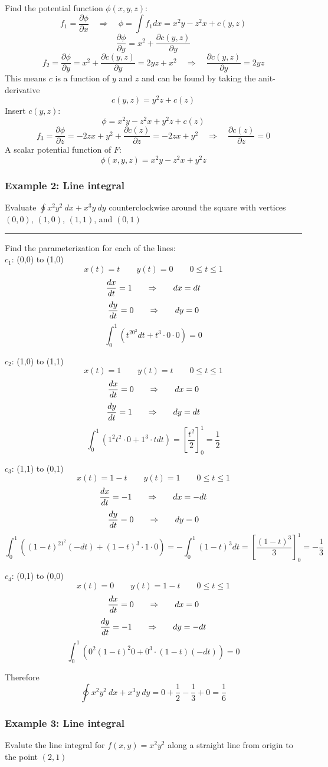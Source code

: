 Find the potential function $\phi(x,y,z)$:
$$f_1=\frac{\partial \phi}{\partial x}\quad\Rightarrow\quad \phi=\int f_1dx=x^2y-z^2x+c(y,z)$$
$$\frac{\partial \phi}{\partial y}=x^2+\frac{\partial c(y,z)}{\partial y}$$
$$f_2=\frac{\partial \phi}{\partial y}=x^2+\frac{\partial c(y,z)}{\partial y}=2yz+x^2\quad\Rightarrow\quad\frac{\partial c(y,z)}{\partial y}=2yz$$ This means $c$ is a function of $y$ and $z$ and can be found by taking the anit-derivative
$$c(y,z)=y^2z+c(z)$$
Insert $c(y,z)$:
$$\phi=x^2y-z^2x+y^2z+c(z)$$
$$f_3=\frac{\partial \phi}{\partial z}=-2zx+y^2+\frac{\partial c(z)}{\partial z}=-2zx+y^2\quad\Rightarrow\quad \frac{\partial c(z)}{\partial z}=0$$
A scalar potential function of $F$:
$$\phi(x,y,z)=x^2y-z^2x+y^2z$$

\subsubsection{Example 2: Line integral}
Evaluate $\oint x^2y^2 \ dx + x^3y\ dy$ counterclockwise around the square with vertices
$(0,0)$, $(1,0)$, $(1, 1)$, and $(0, 1)$

\rule{\textwidth}{0.5pt}

Find the parameterization for each of the lines:\\
$c_1$: (0,0) to (1,0)
$$x(t)=t\qquad y(t)=0\qquad 0\leq t\leq 1$$
$$\frac{dx}{dt}=1{\qquad\Rightarrow\qquad} dx=dt$$
$$\frac{dy}{dt}=0{\qquad\Rightarrow\qquad} dy=0$$
$$\int_0^1(t^20^2 dt + t^3\cdot0 \cdot0)=\boxed{0}$$

$c_2$: (1,0) to (1,1)
$$x(t)=1\qquad y(t)=t\qquad 0\leq t\leq 1$$
$$\frac{dx}{dt}=0{\qquad\Rightarrow\qquad} dx=0$$
$$\frac{dy}{dt}=1{\qquad\Rightarrow\qquad} dy=dt$$
$$\int_0^1(1^2t^2 \cdot 0 + 1^3\cdot t dt)=\left[\frac{t^2}{2}\right]_0^1=\boxed{\frac{1}{2}}$$

$c_3$: (1,1) to (0,1)
$$x(t)=1-t\qquad y(t)=1\qquad 0\leq t\leq 1$$
$$\frac{dx}{dt}=-1{\qquad\Rightarrow\qquad} dx=-dt$$
$$\frac{dy}{dt}=0{\qquad\Rightarrow\qquad} dy=0$$
$$\int_0^1((1-t)^21^2 (-dt) + (1-t)^3\cdot 1 \cdot 0)=-\int_0^1(1-t)^3dt=\left[\frac{(1-t)^3}{3}\right]_0^1=\boxed{-\frac{1}{3}}$$

$c_4$: (0,1) to (0,0)
$$x(t)=0\qquad y(t)=1-t\qquad 0\leq t\leq 1$$
$$\frac{dx}{dt}=0{\qquad\Rightarrow\qquad} dx=0$$
$$\frac{dy}{dt}=-1{\qquad\Rightarrow\qquad} dy=-dt$$
$$\int_0^1(0^2(1-t)^2 0 + 0^3\cdot (1-t) (-dt))=\boxed{0}$$

Therefore
$$\oint x^2y^2 \ dx + x^3y\ dy=0+\frac{1}{2}-\frac{1}{3}+0=\frac{1}{6}$$
\subsubsection{Example 3: Line integral}
Evalute the line integral for $f(x,y)=x^2y^2$ along a straight line from origin to the point $(2,1)$

